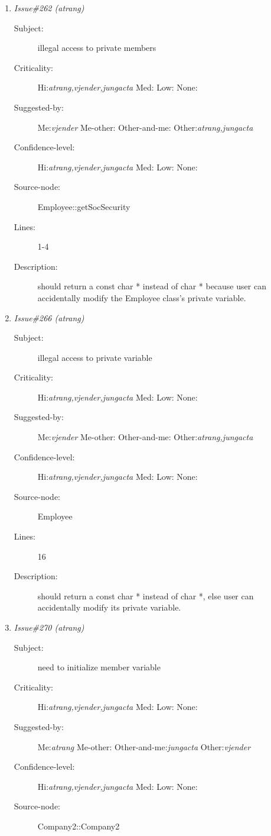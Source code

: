 \begin{enumerate}
\begin{description}
\item [Lines:] 23-26

\item [Description:] the parameter newSSN can have more valid characters than a normal soc sec
number should be.  eg. it can be 888-88-8888000 and this function will still
return successful.
\end{description}
\item {\it Issue\#262 (atrang)}
\begin{description}
\item [Subject:] illegal access to private members
\item [Criticality:] Hi:{\it atrang,vjender,jungacta} Med:{\it } Low:{\it } None:{\it }
\item [Suggested-by:] Me:{\it vjender} Me-other:{\it } Other-and-me:{\it } Other:{\it atrang,jungacta}
\item [Confidence-level:] Hi:{\it atrang,vjender,jungacta} Med:{\it } Low:{\it } None:{\it }
\item [Source-node:] Employee::getSocSecurity

\item [Lines:] 1-4

\item [Description:] should return a const char * instead of char * because user can accidentally
modify the Employee class's private variable.
\end{description}
\item {\it Issue\#266 (atrang)}
\begin{description}
\item [Subject:] illegal access to private variable
\item [Criticality:] Hi:{\it atrang,vjender,jungacta} Med:{\it } Low:{\it } None:{\it }
\item [Suggested-by:] Me:{\it vjender} Me-other:{\it } Other-and-me:{\it } Other:{\it atrang,jungacta}
\item [Confidence-level:] Hi:{\it atrang,vjender,jungacta} Med:{\it } Low:{\it } None:{\it }
\item [Source-node:] Employee

\item [Lines:] 16

\item [Description:] should return a const char * instead of char *, else user can accidentally
modify its private variable.
\end{description}
\item {\it Issue\#270 (atrang)}
\begin{description}
\item [Subject:] need to initialize member variable
\item [Criticality:] Hi:{\it atrang,vjender,jungacta} Med:{\it } Low:{\it } None:{\it }
\item [Suggested-by:] Me:{\it atrang} Me-other:{\it } Other-and-me:{\it jungacta} Other:{\it vjender}
\item [Confidence-level:] Hi:{\it atrang,vjender,jungacta} Med:{\it } Low:{\it } None:{\it }
\item [Source-node:] Company2::Company2


\end{description}
\end{enumerate}
